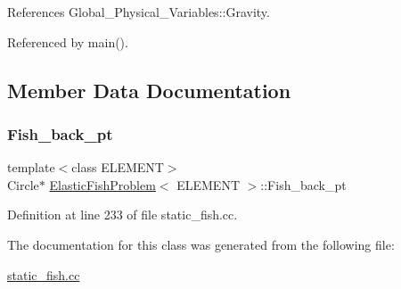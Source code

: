 References Global\+\_\+\+Physical\+\_\+\+Variables\+::\+Gravity.



Referenced by main().



\subsection{Member Data Documentation}
\mbox{\label{classElasticFishProblem_a1a026c063e41c004f656988d6bfd541b}} 
\subsubsection{\texorpdfstring{Fish\+\_\+back\+\_\+pt}{Fish\_back\_pt}}
{\footnotesize\ttfamily template$<$class E\+L\+E\+M\+E\+NT$>$ \\
Circle$\ast$ \hyperlink{classElasticFishProblem}{Elastic\+Fish\+Problem}$<$ E\+L\+E\+M\+E\+NT $>$\+::Fish\+\_\+back\+\_\+pt\hspace{0.3cm}{\ttfamily [private]}}



Definition at line 233 of file static\+\_\+fish.\+cc.



The documentation for this class was generated from the following file\+:\begin{DoxyCompactItemize}
\item 
\hyperlink{static__fish_8cc}{static\+\_\+fish.\+cc}\end{DoxyCompactItemize}
